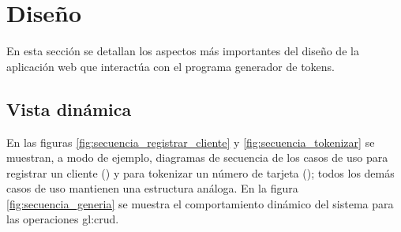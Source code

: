 %
%

\section{Diseño}

En esta sección se detallan los aspectos más importantes del diseño de la
aplicación web que interactúa con el programa generador de tokens.

\subsection{Vista dinámica}

En las figuras \ref{fig:secuencia_registrar_cliente} y
\ref{fig:secuencia_tokenizar} se muestran, a modo de ejemplo, diagramas de
secuencia de los casos de uso para registrar un cliente
() y para tokenizar un número de tarjeta
(); todos los demás casos de uso mantienen una
estructura análoga. En la figura \ref{fig:secuencia_generia} se muestra el
comportamiento dinámico del sistema para las operaciones \gls{gl:crud}.
